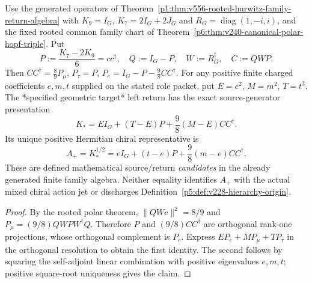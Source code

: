 \documentclass[12pt,a4paper]{article}
\begin{document}
\begin{theorem}
\label{p5:thm:v3218-two-contact-hurwitz-return}
Use the generated operators of
Theorem~\ref{p1:thm:v556-rooted-hurwitz-family-return-algebra}
with $K_9=I_G$, $K_7=2I_G+2J_G$ and
$R_G=\operatorname{diag}(1,-i,i)$, and the fixed rooted common family
chart of Theorem~\ref{p6:thm:v240-canonical-polar-hopf-triple}.
Put
\[
 P:=\frac{K_7-2K_9}{6}=cc^\dagger,
 \quad Q:=I_G-P,
 \quad W:=R_G^\dagger,
 \quad C:=QWP.
\]
Then $CC^\dagger=\frac89P_\mu$, $P_\tau=P$,
$P_e=I_G-P-\frac98CC^\dagger$.  For any positive finite charged
coefficients $e,m,t$ supplied on the stated role packet, put
$E=e^2$, $M=m^2$, $T=t^2$.  The *specified geometric target* left return
has the exact source-generator presentation
\begin{equation}\label{p5:eq:v3218-two-contact-hurwitz-return}
 \boxed{K_*=E I_G+(T-E)P+\frac98(M-E)CC^\dagger.}
\end{equation}
Its unique positive Hermitian chiral representative is
\begin{equation}\label{p5:eq:v3218-positive-candidate}
 \boxed{A_+=K_*^{1/2}=eI_G+(t-e)P+\frac98(m-e)CC^\dagger.}
\end{equation}
These are defined mathematical source/return \emph{candidates} in the
already generated finite family algebra.  Neither equality identifies
$A_+$ with the actual mixed chiral action jet or discharges
Definition~\ref{p5:def:v228-hierarchy-origin}.
\end{theorem}
\begin{proof}
By the rooted polar theorem, $\|QWc\|^2=8/9$ and
$P_\mu=(9/8)QWPW^\dagger Q$.  Therefore $P$ and
$(9/8)CC^\dagger$ are orthogonal rank-one projections, whose
orthogonal complement is $P_e$.  Express
$EP_e+MP_\mu+TP_\tau$ in the orthogonal resolution to obtain the
first identity.  The second follows by squaring the self-adjoint
linear combination with positive eigenvalues $e,m,t$; positive
square-root uniqueness gives the claim.
\end{proof}
\end{document}
